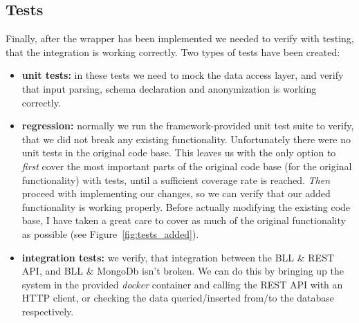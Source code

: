 \subsection{Tests}

Finally, after the wrapper has been implemented we needed to verify with testing, that the integration is working correctly. Two types of tests have been created:
\begin{itemize}
    \item \textbf{unit tests:} in these tests we need to mock the data access layer, and verify that input parsing, schema declaration and anonymization is working correctly.
    \item \textbf{regression:} normally we run the framework-provided unit test suite to verify, that we did not break any existing functionality. Unfortunately there were no unit tests in the original code base. This leaves us with the only option to \emph{first} cover the most important parts of the original code base (for the original functionality) with tests, until a sufficient coverage rate is reached. \emph{Then} proceed with implementing our changes, so we can verify that our added functionality is working properly. Before actually modifying the existing code base, I have taken a great care to cover as much of the original functionality as possible (see Figure~\ref{fig:tests_added}).
    \item \textbf{integration tests:} we verify, that integration between the BLL \& REST API, and BLL \& MongoDb isn't broken. We can do this by bringing up the system in the provided \emph{docker} container and calling the REST API with an HTTP client, or checking the data queried/inserted from/to the database respectively.
\end{itemize}

\vspace{\baselineskip}
